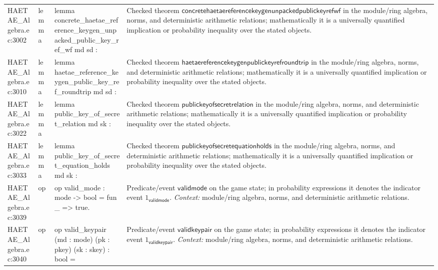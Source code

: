 \documentclass[10pt]{article}
\begin{document}
\begin{longtable}{L{0.11\textwidth}L{0.055\textwidth}L{0.385\textwidth}L{0.41\textwidth}}
HAETAE\_\allowbreak{}Algebra.\allowbreak{}ec:\allowbreak{}3002 & lemma & {\ttfamily\scriptsize lemma concrete\_\allowbreak{}haetae\_\allowbreak{}reference\_\allowbreak{}keygen\_\allowbreak{}unpacked\_\allowbreak{}public\_\allowbreak{}key\_\allowbreak{}ref\_\allowbreak{}wf md sd :} & Checked theorem $\mathsf{concretehaetaereferencekeygenunpackedpublickeyrefwf}$ in the module/ring algebra, norms, and deterministic arithmetic relations; mathematically it is a universally quantified implication or probability inequality over the stated objects. \\
HAETAE\_\allowbreak{}Algebra.\allowbreak{}ec:\allowbreak{}3010 & lemma & {\ttfamily\scriptsize lemma haetae\_\allowbreak{}reference\_\allowbreak{}keygen\_\allowbreak{}public\_\allowbreak{}key\_\allowbreak{}ref\_\allowbreak{}roundtrip md sd :} & Checked theorem $\mathsf{haetaereferencekeygenpublickeyrefroundtrip}$ in the module/ring algebra, norms, and deterministic arithmetic relations; mathematically it is a universally quantified implication or probability inequality over the stated objects. \\
HAETAE\_\allowbreak{}Algebra.\allowbreak{}ec:\allowbreak{}3022 & lemma & {\ttfamily\scriptsize lemma public\_\allowbreak{}key\_\allowbreak{}of\_\allowbreak{}secret\_\allowbreak{}relation md sk :} & Checked theorem $\mathsf{publickeyofsecretrelation}$ in the module/ring algebra, norms, and deterministic arithmetic relations; mathematically it is a universally quantified implication or probability inequality over the stated objects. \\
HAETAE\_\allowbreak{}Algebra.\allowbreak{}ec:\allowbreak{}3033 & lemma & {\ttfamily\scriptsize lemma public\_\allowbreak{}key\_\allowbreak{}of\_\allowbreak{}secret\_\allowbreak{}equation\_\allowbreak{}holds md sk :} & Checked theorem $\mathsf{publickeyofsecretequationholds}$ in the module/ring algebra, norms, and deterministic arithmetic relations; mathematically it is a universally quantified implication or probability inequality over the stated objects. \\
HAETAE\_\allowbreak{}Algebra.\allowbreak{}ec:\allowbreak{}3039 & op & {\ttfamily\scriptsize op valid\_\allowbreak{}mode : mode -\textgreater{} bool = fun \_\allowbreak{} =\textgreater{} true.} & Predicate/event $\mathsf{validmode}$ on the game state; in probability expressions it denotes the indicator event $1_{\mathsf{validmode}}$. \emph{Context:} module/ring algebra, norms, and deterministic arithmetic relations. \\
HAETAE\_\allowbreak{}Algebra.\allowbreak{}ec:\allowbreak{}3040 & op & {\ttfamily\scriptsize op valid\_\allowbreak{}keypair (md : mode) (pk : pkey) (sk : skey) : bool =} & Predicate/event $\mathsf{validkeypair}$ on the game state; in probability expressions it denotes the indicator event $1_{\mathsf{validkeypair}}$. \emph{Context:} module/ring algebra, norms, and deterministic arithmetic relations. \\

\end{longtable}
\end{document}
